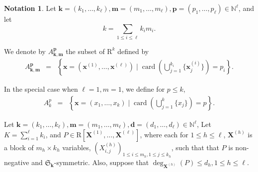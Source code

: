 \documentclass{amsart}
\theoremstyle{definition}
\newtheorem{notation}{Notation}
\theoremstyle{remark}
\numberwithin{equation}{section}
\begin{document}
\begin{notation}
 Let ${\mathbf{k}} = (k_1,\ldots,k_\ell),{\mathbf{m}} = (m_1,\ldots,m_\ell),
 \mathbf{p} =(p_1,\ldots,p_\ell)  \in {\mathbb{N}}^\ell$, and let
 \[
 k = \sum_{1 \leq i \leq \ell} k_i m_i.
 \]
 
 We denote by $A_{{\mathbf{k}},{\mathbf{m}}}^{\mathbf{p}}$ the
  subset of ${\mathrm{R}}^{k}$ defined by
  \begin{eqnarray*}
    A^{\mathbf{p}}_{{\mathbf{k}},{\mathbf{m}}} & = & \left\{ {\mathbf{x}}= ({\mathbf{x}}^{(1)} , \ldots, {\mathbf{x}}^{(
    \ell)}) \mid  \ensuremath{\operatorname{card}} 
    \left(\bigcup_{j=1}^{k_i} \{ {\mathbf{x}}_{j}^{(i)} \} \right) = p_{i} \right\} .
  \end{eqnarray*}
  
  In the special case when $\ell=1,m=1$, we define for $p \leq k$,
  \begin{eqnarray*}
    A^{p}_{k} & = & \left\{ {\mathbf{x}}=(x_1,\ldots,x_k)  \mid  \ensuremath{\operatorname{card}} \left(
    \bigcup_{j=1}^{k} \{ x_j \} \right) = p \right\} .
  \end{eqnarray*}
\end{notation}

Let ${\mathbf{k}} = (k_1,\ldots,k_\ell),{\mathbf{m}} = (m_1,\ldots,m_\ell),
 {\mathbf{d}} =(d_1,\ldots,d_\ell)  \in {\mathbb{N}}^\ell$,
  Let $K= \sum_{i=1}^{\ell} k_{i}$, and $P
  \in {\mathrm{R}} [ {\mathbf{X}}^{(1)} , \ldots, {\mathbf{X}}^{(\ell)} ]$, where each
  for $1\leq h \leq \ell$, ${\mathbf{X}}^{(h)}$ is a block of $m_h\times k_{h}$ variables, 
  $\left( X^{(h)}_{i,j}\right)_{1\leq i \leq m_h,1\leq j\leq k_h}$, such that
  that $P$ is non-negative and $\mathfrak{S}_{\mathbf{k}}$-symmetric.
Also, suppose that $\deg_{{\mathbf{X}}^{(h)}} (P) \leq d_h, 1\leq h \leq \ell$.
\end{document}

